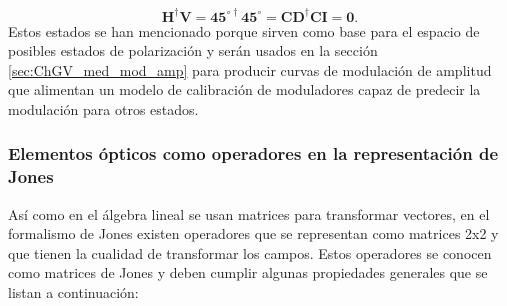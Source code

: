 \begin{equation*}
\mathbf{H^{\dagger}V} = \mathbf{45^{\circ\dagger}45^{\circ}} =
\mathbf{CD^{\dagger}CI = 0.}   
\end{equation*}
Estos estados se han mencionado porque sirven como base para el espacio
de posibles estados de polarización y serán usados en la sección
\ref{sec:ChGV_med_mod_amp} para producir curvas de modulación de
amplitud que alimentan un modelo de calibración de moduladores capaz
de predecir la modulación para otros estados. 

\subsubsection{Elementos ópticos como operadores en la representación
  de Jones}

Así como en el álgebra lineal se usan matrices para transformar
vectores, en el formalismo de Jones existen operadores que se
representan como matrices 2x2 y que tienen la cualidad de
transformar los campos. Estos operadores se conocen como matrices de
Jones y deben cumplir algunas
propiedades generales  que se listan a continuación:

